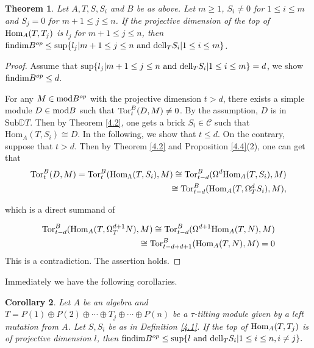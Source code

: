 \documentclass[a4paper]{amsart}
\newtheorem{thm}{Theorem}[section]
\newtheorem{cor}[thm]{Corollary}
\theoremstyle{definition}
\theoremstyle{remark}
\numberwithin{equation}{section}
\begin{document}
\begin{thm}\label{4.8} Let $A, T, S, S_i$ and $B$ be as above. Let $m\geq 1$, $S_i\neq 0$ for $1\leq i\leq m$ and $S_j=0$ for $m+1\leq j\leq n$. If the projective dimension of the top of $\textup{Hom}_A(T,T_j)$ is $l_j$ for $m+1\leq j\leq n$, then $\textup{findim}B^{op}\leq \textup{sup}\{l_j|m+1\leq j\leq n\ \textup{and}\ \textup{dell}_T S_i|1\leq i\leq m\}$.
\end{thm}
\begin{proof} Assume that $\textup{sup}\{l_j|m+1\leq j\leq n\ \textup{and}\ \textup{dell}_T S_i|1\leq i\leq m\}=d$, we show $\textup{findim}B^{op} \leq d$.

For any $M \in \textup{mod}B^{op}$ with the projective dimension $t>d$, there exists a simple module $ D\in \textup{mod}B$ such that $\textup{Tor}^B_t (D, M) \neq 0$. By the assumption, $D$ is in $\text{Sub}\mathbb{D}T$. Then by Theorem \ref{4.2}, one gets a brick $S_i\in \mathcal{C}$ such that $\text{Hom}_A(T,S_i)\cong D$. In the following, we show that $t \leq d.$ On the contrary, suppose that $t>d$. Then by Theorem \ref{4.2} and Proposition \ref{4.4}(2), one can get that
\begin{align*}
\text{Tor}_{t}^B (D, M) = \text{Tor}_{t}^B (\textup{Hom}_\Lambda(T,S_i), M) \cong \text{Tor}_{t-d}^B (\Omega^d \textup{Hom}_A(T,S_i), M) \\ \cong \text{Tor}_{t-d}^B (\textup{Hom}_A(T,\Omega_T^d S_i), M),
\end{align*}

 which is a direct summand of

 \begin{align*}
 \text{Tor}_{t-d}^B (\textup{Hom}_A(T,\Omega_T^{d+1} N), M) \cong \text{Tor}_{t-d}^B (\Omega^{d+1}\textup{Hom}_A(T, N), M)\\ \cong \text{Tor}_{t-d+d+1}^B (\textup{Hom}_A(T, N), M)=0
\end{align*} This is a contradiction. The assertion holds.
\end{proof}

Immediately we have the following corollaries.

\begin{cor}\label{4.9} Let $A$ be an algebra and $T=P(1)\oplus P(2)\oplus\cdots\oplus T_j\oplus\cdots\oplus P(n)$ be a $\tau$-tilting module given by a left mutation from $A$. Let $S, S_i$ be as in Definition \ref{4.1}. If the top of $\textup{Hom}_A(T, T_j)$ is of projective dimension $l$, then $\textup{findim}B^{op}\leq \textup{sup}\{l\ \textup{and}\ \textup{dell}_T S_i|1\leq i\leq n, i\neq j\}.$
\end{cor}
\end{document}
